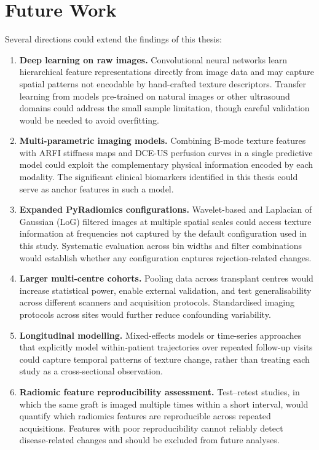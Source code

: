 \section{Future Work}
\label{sec:future_work}

Several directions could extend the findings of this thesis:

\begin{enumerate}

\item \textbf{Deep learning on raw images.} Convolutional neural networks learn hierarchical feature representations directly from image data and may capture spatial patterns not encodable by hand-crafted texture descriptors. Transfer learning from models pre-trained on natural images or other ultrasound domains could address the small sample limitation, though careful validation would be needed to avoid overfitting.

\item \textbf{Multi-parametric imaging models.} Combining B-mode texture features with ARFI stiffness maps and DCE-US perfusion curves in a single predictive model could exploit the complementary physical information encoded by each modality. The significant clinical biomarkers identified in this thesis could serve as anchor features in such a model.

\item \textbf{Expanded PyRadiomics configurations.} Wavelet-based and Laplacian of Gaussian (LoG) filtered images at multiple spatial scales could access texture information at frequencies not captured by the default configuration used in this study. Systematic evaluation across bin widths and filter combinations would establish whether any configuration captures rejection-related changes.

\item \textbf{Larger multi-centre cohorts.} Pooling data across transplant centres would increase statistical power, enable external validation, and test generalisability across different scanners and acquisition protocols. Standardised imaging protocols across sites would further reduce confounding variability.

\item \textbf{Longitudinal modelling.} Mixed-effects models or time-series approaches that explicitly model within-patient trajectories over repeated follow-up visits could capture temporal patterns of texture change, rather than treating each study as a cross-sectional observation.

\item \textbf{Radiomic feature reproducibility assessment.} Test--retest studies, in which the same graft is imaged multiple times within a short interval, would quantify which radiomics features are reproducible across repeated acquisitions. Features with poor reproducibility cannot reliably detect disease-related changes and should be excluded from future analyses.

\end{enumerate}


